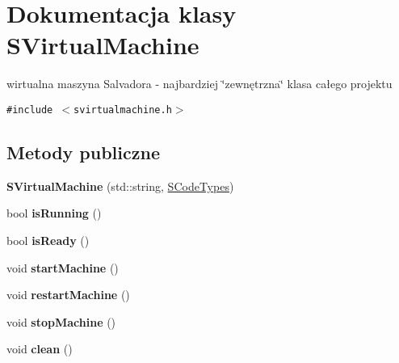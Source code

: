 \hypertarget{classSVirtualMachine}{
\section{Dokumentacja klasy SVirtualMachine}
\label{classSVirtualMachine}
}
wirtualna maszyna Salvadora - najbardziej \char`\"{}zewnętrzna\char`\"{} klasa całego projektu  


{\tt \#include $<$svirtualmachine.h$>$}

\subsection*{Metody publiczne}
\begin{CompactItemize}
\item 
\hypertarget{classSVirtualMachine_020a4e9202a688dffed1e0d8951f9164}{
\textbf{SVirtualMachine} (std::string, \hyperlink{senums_8h_1a2ae45552936d27425f99e1c187b043}{SCodeTypes})}
\label{classSVirtualMachine_020a4e9202a688dffed1e0d8951f9164}

\item 
\hypertarget{classSVirtualMachine_09f1f983396791f84947f80097351862}{
bool \textbf{isRunning} ()}
\label{classSVirtualMachine_09f1f983396791f84947f80097351862}

\item 
\hypertarget{classSVirtualMachine_86dfbb99cbccd36729253cf34835c805}{
bool \textbf{isReady} ()}
\label{classSVirtualMachine_86dfbb99cbccd36729253cf34835c805}

\item 
\hypertarget{classSVirtualMachine_3c530338eaccb6bc585ba689ace469a7}{
void \textbf{startMachine} ()}
\label{classSVirtualMachine_3c530338eaccb6bc585ba689ace469a7}

\item 
\hypertarget{classSVirtualMachine_6b2dedbf7e71aeb57c89ada07141a2d1}{
void \textbf{restartMachine} ()}
\label{classSVirtualMachine_6b2dedbf7e71aeb57c89ada07141a2d1}

\item 
\hypertarget{classSVirtualMachine_47097e43ad093ef4900df2d888043da6}{
void \textbf{stopMachine} ()}
\label{classSVirtualMachine_47097e43ad093ef4900df2d888043da6}

\item 
\hypertarget{classSVirtualMachine_85f2b4a688a077283010a11145289110}{
void \textbf{clean} ()}
\label{classSVirtualMachine_85f2b4a688a077283010a11145289110}


\end{CompactItemize}
